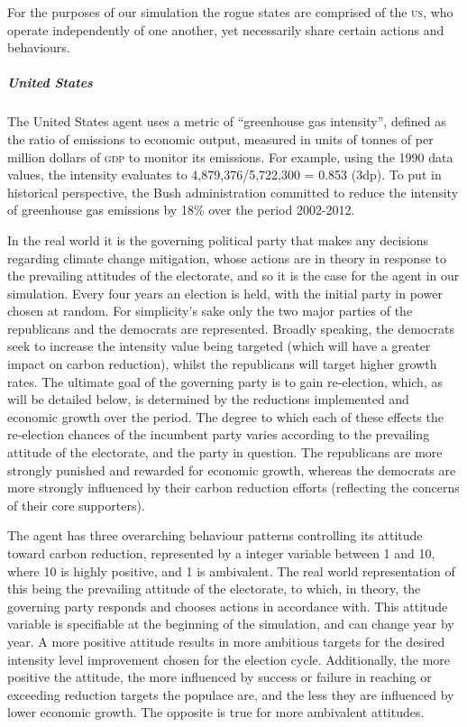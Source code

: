 For the purposes of our simulation the rogue states are comprised of the \textsc{us}, who operate independently of one another, yet necessarily share certain actions and behaviours. 

\subparagraph{United States}

The United States agent uses a metric of ``greenhouse gas intensity'', defined as the ratio of emissions to economic output, measured in units of tonnes of \CO per million dollars of \textsc{gdp} to monitor its emissions. For example, using the 1990 data values, the intensity evaluates to 4,879,376/5,722,300 = 0.853 (3dp). To put in historical perspective, the Bush administration committed to reduce the intensity of greenhouse gas emissions by 18\% over the period 2002-2012.

In the real world it is the governing political party that makes any decisions regarding climate change mitigation, whose actions are in theory in response to the prevailing attitudes of the electorate, and so it is the case for the agent in our simulation. Every four years an election is held, with the initial party in power chosen at random. For simplicity's sake only the two major parties of the republicans and the democrats are represented. Broadly speaking, the democrats seek to increase the intensity value being targeted (which will have a greater impact on carbon reduction), whilst the republicans will target higher growth rates. The ultimate goal of the governing party is to gain re-election, which, as will be detailed below, is determined by the reductions implemented and economic growth over the period. The degree to which each of these effects the re-election chances of the incumbent party varies according to the prevailing attitude of the electorate, and the party in question. The republicans are more strongly punished and rewarded for economic growth, whereas the democrats are more strongly influenced by their carbon reduction efforts (reflecting the concerns of their core supporters). 

The agent has three overarching behaviour patterns controlling its attitude toward carbon reduction, represented by a integer variable between 1 and 10, where 10 is highly positive, and 1 is ambivalent. The real world representation of this being the prevailing attitude of the electorate, to which, in theory, the governing party responds and chooses actions in accordance with. This attitude variable is specifiable at the beginning of the simulation, and can change year by year. A more positive attitude results in more ambitious targets for the desired intensity level improvement chosen for the election cycle. Additionally, the more positive the attitude, the more influenced by success or failure in reaching or exceeding reduction targets the populace are, and the less they are influenced by lower economic growth. The opposite is true for more ambivalent attitudes.

